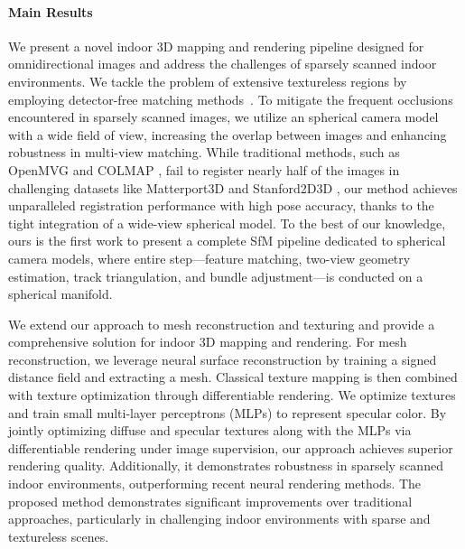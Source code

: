 \paragraph{Main Results}
We present a novel indoor 3D mapping and rendering pipeline designed for omnidirectional images and address the challenges of sparsely scanned indoor environments.
We tackle the problem of extensive textureless regions by employing detector-free matching methods~\cite{EDM}.
To mitigate the frequent occlusions encountered in sparsely scanned images, we utilize an spherical camera model with a wide field of view, increasing the overlap between images and enhancing robustness in multi-view matching.
 While traditional methods, such as OpenMVG \cite{moulon2017openmvg} and COLMAP \cite{schonberger2016structure}, fail to register nearly half of the images in challenging datasets like Matterport3D \cite{chang2017matterport3d} and Stanford2D3D \cite{Stanford2d3d}, our method achieves unparalleled registration performance with high pose accuracy, thanks to the tight integration of a wide-view spherical model.
To the best of our knowledge, ours is the first work to present a complete SfM pipeline dedicated to spherical camera models, where entire step—feature matching, two-view geometry estimation, track triangulation, and bundle adjustment—is conducted on a spherical manifold.

We extend our approach to mesh reconstruction and texturing and provide a comprehensive solution for indoor 3D mapping and rendering.  For mesh reconstruction, we leverage neural surface reconstruction \cite{xiao2024debsdf} by training a signed distance field and extracting a mesh. Classical texture mapping \cite{waechter2014TexRecon} is then combined with texture optimization through differentiable rendering. We optimize textures and train small multi-layer perceptrons (MLPs) to represent specular color. By jointly optimizing diffuse and specular textures along with the MLPs via differentiable rendering \cite{nvdiffrast} under image supervision, our approach achieves superior rendering quality. Additionally, it demonstrates robustness in sparsely scanned indoor environments, outperforming recent neural rendering methods. The proposed method demonstrates significant improvements over traditional approaches, particularly in challenging indoor environments with sparse and textureless scenes. 

